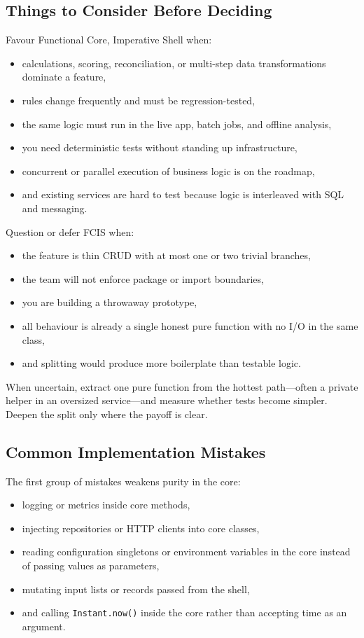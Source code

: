 \subsection{Things to Consider Before Deciding}
\label{sec:fcis_when_to_choose}

Favour Functional Core, Imperative Shell when:
\begin{itemize}
    \item calculations, scoring, reconciliation, or multi-step data transformations dominate a feature,
    \item rules change frequently and must be regression-tested,
    \item the same logic must run in the live app, batch jobs, and offline analysis,
    \item you need deterministic tests without standing up infrastructure,
    \item concurrent or parallel execution of business logic is on the roadmap,
    \item and existing services are hard to test because logic is interleaved with SQL and messaging.
\end{itemize}

Question or defer FCIS when:
\begin{itemize}
    \item the feature is thin CRUD with at most one or two trivial branches,
    \item the team will not enforce package or import boundaries,
    \item you are building a throwaway prototype,
    \item all behaviour is already a single honest pure function with no I/O in the same class,
    \item and splitting would produce more boilerplate than testable logic.
\end{itemize}

When uncertain, extract one pure function from the hottest path---often a private helper in an oversized service---and measure whether tests become simpler. Deepen the split only where the payoff is clear.

\subsection{Common Implementation Mistakes}
\label{sec:fcis_common_mistakes}

The first group of mistakes weakens purity in the core:
\begin{itemize}
    \item logging or metrics inside core methods,
    \item injecting repositories or HTTP clients into core classes,
    \item reading configuration singletons or environment variables in the core instead of passing values as parameters,
    \item mutating input lists or records passed from the shell,
    \item and calling \texttt{Instant.now()} inside the core rather than accepting time as an argument.
\end{itemize}

